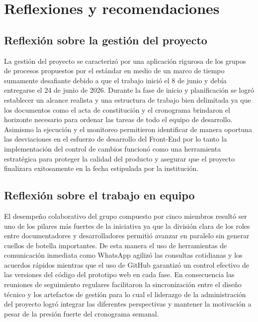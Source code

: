 \documentclass[11pt,spanish]{article}
\begin{document}
\newpage
\section{Reflexiones y recomendaciones}

\subsection{Reflexión sobre la gestión del proyecto}

La gestión del proyecto se caracterizó por una aplicación rigurosa de los grupos de procesos propuestos por el estándar en medio de un marco de tiempo sumamente desafiante debido a que el trabajo inició el 8 de junio y debía entregarse el 24 de junio de 2026. Durante la fase de inicio y planificación se logró establecer un alcance realista y una estructura de trabajo bien delimitada ya que los documentos como el acta de constitución y el cronograma brindaron el horizonte necesario para ordenar las tareas de todo el equipo de desarrollo. Asimismo la ejecución y el monitoreo permitieron identificar de manera oportuna las desviaciones en el esfuerzo de desarrollo del Front-End por lo tanto la implementación del control de cambios funcionó como una herramienta estratégica para proteger la calidad del producto y asegurar que el proyecto finalizara exitosamente en la fecha estipulada por la institución.

\subsection{Reflexión sobre el trabajo en equipo}

El desempeño colaborativo del grupo compuesto por cinco miembros resultó ser uno de los pilares más fuertes de la iniciativa ya que la división clara de los roles entre documentadores y desarrolladores permitió avanzar en paralelo sin generar cuellos de botella importantes. De esta manera el uso de herramientas de comunicación inmediata como WhatsApp agilizó las consultas cotidianas y los acuerdos rápidos mientras que el uso de GitHub garantizó un control efectivo de las versiones del código del prototipo web en cada fase. En consecuencia las reuniones de seguimiento regulares facilitaron la sincronización entre el diseño técnico y los artefactos de gestión para lo cual el liderazgo de la administración del proyecto logró integrar las diferentes perspectivas y mantener la motivación a pesar de la presión fuerte del cronograma semanal.
\end{document}
